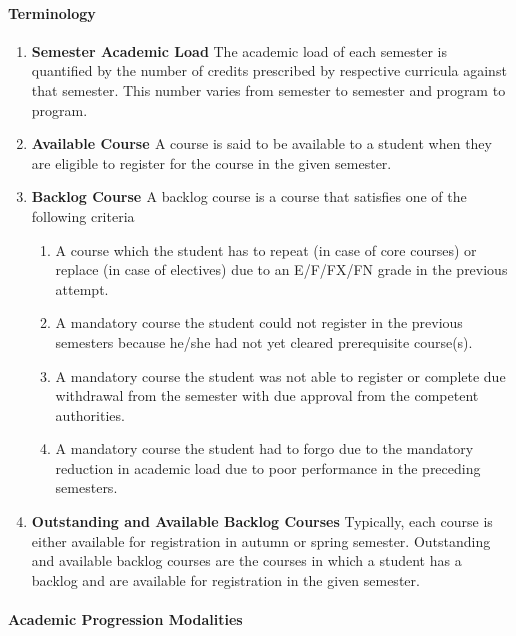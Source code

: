 \paragraph{Terminology}

\begin{enumerate}[leftmargin=15mm]
    \item \textbf{Semester Academic Load\label{lab:Semester Academic Load}} The academic load of each semester is quantified by the number of credits prescribed by respective curricula against that semester. This number varies from semester to semester and program to program.
    \item \textbf{Available Course \label{lab:Avaiable Course}} A course is said to be available to a student when they are eligible to register for the course in the given semester.
    \item \textbf{Backlog Course \label{lab:Backlog Course}} A backlog course is a course that satisfies one of the following criteria
    
    \begin{enumerate}
        \item A course which the student has to repeat (in case of core courses) or replace (in case of electives) due to an E/F/FX/FN grade in the previous attempt. 
        \item A mandatory course the student could not register in the previous semesters because he/she had not yet cleared prerequisite course(s).
        \item A mandatory course the student was not able to register or complete due withdrawal from the semester with due approval from the competent authorities.
        \item A mandatory course the student had to forgo due to the mandatory reduction in academic load due to poor performance in the preceding semesters.
    \end{enumerate}
    
    \item \textbf{Outstanding and Available Backlog Courses }Typically, each course is either available for registration in autumn or spring semester. Outstanding and available backlog courses are the courses in which a student has a backlog and are available for registration in the given semester.
\end{enumerate}

\paragraph{Academic Progression Modalities}

